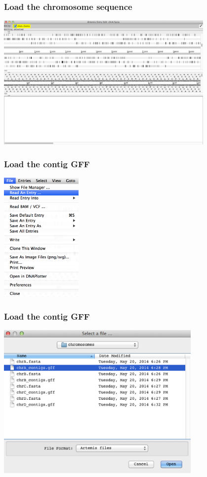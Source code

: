 \documentclass[table]{beamer}
\begin{document}
  \begin{frame}
    \frametitle{Load the chromosome sequence}
    \begin{center}
      \includegraphics[width=0.8\textwidth]{images/artemis_loaded_seq} 
    \end{center}
\end{frame}     

  \begin{frame}
    \frametitle{Load the contig GFF}
    \begin{center}
      \includegraphics[width=0.3\textwidth]{images/artemis_read_entry} 
    \end{center}
\end{frame}     

  \begin{frame}
    \frametitle{Load the contig GFF}
    \begin{center}
      \includegraphics[width=0.75\textwidth]{images/artemis_select_contig_gff} 
    \end{center}
\end{frame}     
\end{document}
